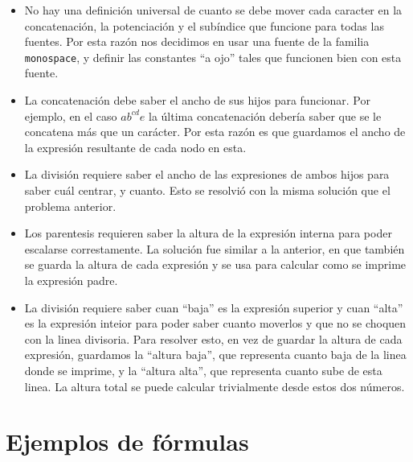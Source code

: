 \documentclass[a4paper, 10pt, twoside]{article}
\begin{document}
\begin{itemize}
\item No hay una definici\'on universal de cuanto se debe mover cada caracter en la concatenaci\'on, la potenciaci\'on y el sub\'indice que funcione para todas las fuentes. Por esta raz\'on nos decidimos en usar una fuente de la familia \texttt{monospace}, y definir las constantes ``a ojo'' tales que funcionen bien con esta fuente.
\item La concatenaci\'on debe saber el ancho de sus hijos para funcionar. Por ejemplo, en el caso \(ab^{cd}e\) la \'ultima concatenaci\'on deber\'ia saber que se le concatena m\'as que un car\'acter. Por esta raz\'on es que guardamos el ancho de la expresi\'on resultante de cada nodo en esta.
\item La divisi\'on requiere saber el ancho de las expresiones de ambos hijos para saber cu\'al centrar, y cuanto. Esto se resolvi\'o con la misma soluci\'on que el problema anterior.
\item Los parentesis requieren saber la altura de la expresi\'on interna para poder escalarse correstamente. La soluci\'on fue similar a la anterior, en que tambi\'en se guarda la altura de cada expresi\'on y se usa para calcular como se imprime la expresi\'on padre.
\item La divisi\'on requiere saber cuan ``baja'' es la expresi\'on superior y cuan ``alta'' es la expresi\'on inteior para poder saber cuanto moverlos y que no se choquen con la linea divisoria. Para resolver esto, en vez de guardar la altura de cada expresi\'on, guardamos la ``altura baja'', que representa cuanto baja de la linea donde se imprime, y la ``altura alta'', que representa cuanto sube de esta linea. La altura total se puede calcular trivialmente desde estos dos n\'umeros.
\end{itemize}

\section{Ejemplos de f\'ormulas}
\end{document}

